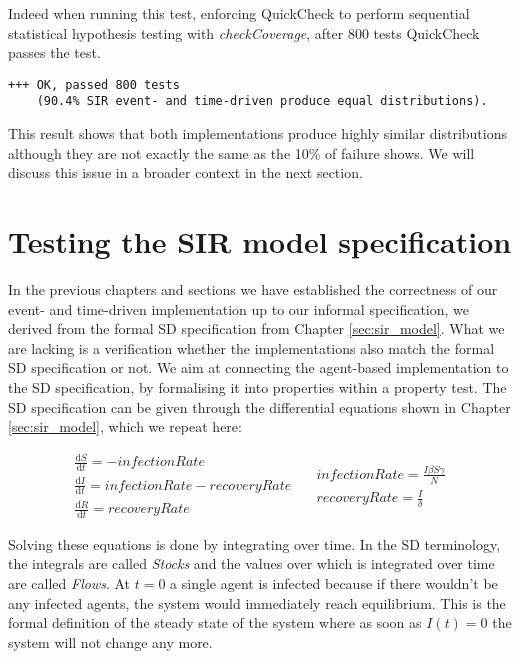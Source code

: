 Indeed when running this test, enforcing QuickCheck to perform sequential statistical hypothesis testing with \textit{checkCoverage}, after 800 tests QuickCheck passes the test.

\begin{verbatim}
+++ OK, passed 800 tests 
    (90.4% SIR event- and time-driven produce equal distributions).
\end{verbatim}

This result shows that both implementations produce highly similar distributions although they are not exactly the same as the 10\% of failure shows. We will discuss this issue in a broader context in the next section.

\section{Testing the SIR model specification}
\label{sec:prop_sirspecs}
In the previous chapters and sections we have established the correctness of our event- and time-driven implementation up to our informal specification, we derived from the formal SD specification from Chapter \ref{sec:sir_model}. What we are lacking is a verification whether the implementations also match the formal SD specification or not. We aim at connecting the agent-based implementation to the SD specification, by formalising it into properties within a property test. The SD specification can be given through the differential equations shown in Chapter \ref{sec:sir_model}, which we repeat here:

\begin{equation}
\begin{split}
\frac{\mathrm d S}{\mathrm d t} = -infectionRate \\
\frac{\mathrm d I}{\mathrm d t} = infectionRate - recoveryRate \\
\frac{\mathrm d R}{\mathrm d t} = recoveryRate 
\end{split}
\quad
\begin{split}
infectionRate = \frac{I \beta S \gamma}{N} \\
recoveryRate = \frac{I}{\delta} 
\end{split}
\end{equation}
\label{eq:sir_delta_rates}

Solving these equations is done by integrating over time. In the SD terminology, the integrals are called \textit{Stocks} and the values over which is integrated over time are called \textit{Flows}. At $t = 0$ a single agent is infected because if there wouldn't be any infected agents, the system would immediately reach equilibrium. This is the formal definition of the steady state of the system where as soon as $I(t) = 0$ the system will not change any more.

